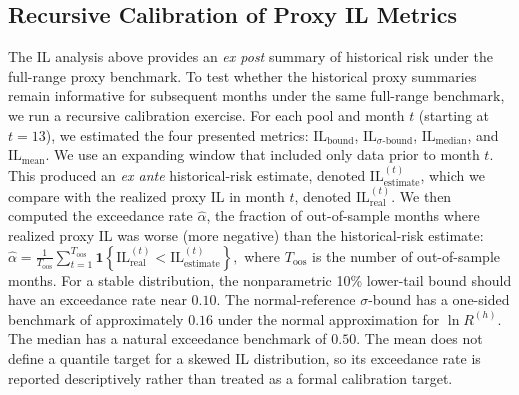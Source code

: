 \documentclass[anonymous]{lipics-v2021}
\begin{document}
{\subsection{Recursive Calibration of Proxy IL Metrics}
\label{subsec:backtesting_il}

The IL analysis above provides an \emph{ex post} summary of historical risk under the full-range proxy benchmark. 
To test whether the historical proxy summaries remain informative for subsequent months under the same full-range benchmark, we run a recursive calibration exercise.
For each pool and month $t$ (starting at $t=13$), we estimated the four presented metrics: $\mathrm{IL}_{\text{bound}}$, $\mathrm{IL}_{\sigma\text{-bound}}$, $\mathrm{IL}_{\text{median}}$, and $\mathrm{IL}_{\text{mean}}$. We use an expanding window that included only data prior to month $t$. 
This produced an \emph{ex ante} historical-risk estimate, denoted $\mathrm{IL}^{(t)}_{\text{estimate}}$, which we compare with the realized proxy IL in month $t$, denoted $\mathrm{IL}^{(t)}_{\text{real}}$.
We then computed the exceedance rate $\hat{\alpha}$, the fraction of out-of-sample months where realized proxy IL was worse (more negative) than the historical-risk estimate:
\(
\hat{\alpha}
= \frac{1}{T_{\text{oos}}}\sum_{t=1}^{T_{\text{oos}}}
\mathbf{1}\!\left\{\mathrm{IL}^{(t)}_{\text{real}} < \mathrm{IL}^{(t)}_{\text{estimate}}\right\},
\)
where $T_{\text{oos}}$ is the number of out-of-sample months. 
For a stable distribution, the nonparametric 10\% lower-tail bound should have an exceedance rate near $0.10$. The normal-reference $\sigma$-bound has a one-sided benchmark of approximately $0.16$ under the normal approximation for $\ln R^{(h)}$. The median has a natural exceedance benchmark of $0.50$. The mean does not define a quantile target for a skewed IL distribution, so its exceedance rate is reported descriptively rather than treated as a formal calibration target.

}
\end{document}
